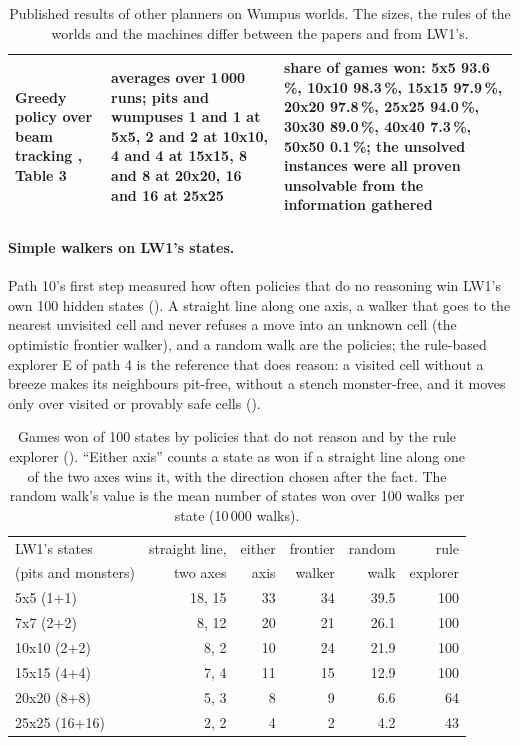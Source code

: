 \begin{table}[tbp]
\begin{tabularx}{\textwidth}{@{}>{\raggedright\arraybackslash}p{3.0cm}>{\raggedright\arraybackslash}p{3.1cm}>{\raggedright\arraybackslash}X@{}}
Greedy policy over beam tracking \cite{bonet2013causal}, Table 3 &
averages over 1\,000 runs; pits and wumpuses 1 and 1 at 5x5, 2 and 2 at 10x10,
4 and 4 at 15x15, 8 and 8 at 20x20, 16 and 16 at 25x25 &
share of games won: 5x5 93.6\,\%, 10x10 98.3\,\%, 15x15 97.9\,\%, 20x20
97.8\,\%, 25x25 94.0\,\%, 30x30 89.0\,\%, 40x40 7.3\,\%, 50x50 0.1\,\%; the
unsolved instances were all proven unsolvable from the information gathered \\
\bottomrule
\end{tabularx}
\caption{Published results of other planners on Wumpus worlds. The sizes, the
rules of the worlds and the machines differ between the papers and from LW1's.}
\label{tab:published-others}
\end{table}

\paragraph{Simple walkers on LW1's states.} Path 10's first step measured how
often policies that do no reasoning win LW1's own 100 hidden states
(). A straight line along one axis, a walker that goes to the
nearest unvisited cell and never refuses a move into an unknown cell (the optimistic
frontier walker), and a random walk are the policies; the rule-based explorer E of
path 4 is the reference that does reason: a visited cell without a breeze makes its
neighbours pit-free, without a stench monster-free, and it moves only over visited
or provably safe cells ().

\begin{table}[tbp]
\centering
\small
\begin{tabular}{@{}lrrrrr@{}}
\toprule
LW1's states & straight line, & either & frontier & random & rule \\
(pits and monsters) & two axes & axis & walker & walk & explorer \\
\midrule
5x5 (1+1)    & 18, 15 & 33 & 34 & 39.5 & 100 \\
7x7 (2+2)    & 8, 12  & 20 & 21 & 26.1 & 100 \\
10x10 (2+2)  & 8, 2   & 10 & 24 & 21.9 & 100 \\
15x15 (4+4)  & 7, 4   & 11 & 15 & 12.9 & 100 \\
20x20 (8+8)  & 5, 3   & 8  & 9  & 6.6  & 64 \\
25x25 (16+16) & 2, 2  & 4  & 2  & 4.2  & 43 \\
\bottomrule
\end{tabular}
\caption[Games won of 100 states by policies that do not reason and by the rule
explorer.]{Games won of 100 states by policies that do not reason and by the rule
explorer (). ``Either axis'' counts a state as won if a straight line along
one of the two axes wins it, with the direction chosen after the fact. The random
walk's value is the mean number of states won over 100 walks per state (10\,000 walks).}
\label{tab:walkers}
\end{table}


